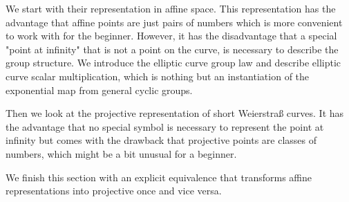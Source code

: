 We start with their representation in affine space. This representation has the advantage that affine points are just pairs of numbers which is more convenient to work with for the beginner. However, it has the disadvantage that a special "point at infinity" that is not a point on the curve, is necessary to describe the group structure. We introduce the elliptic curve group law and describe elliptic curve scalar multiplication, which is nothing but an instantiation of the exponential map from general cyclic groups.

Then we look at the projective representation of short Weierstraß curves. It has the advantage that no special symbol is necessary to represent the point at infinity but comes with the drawback that projective points are classes of numbers, which might be a bit unusual for a beginner.

We finish this section with an explicit equivalence that transforms affine representations into projective once and vice versa.

